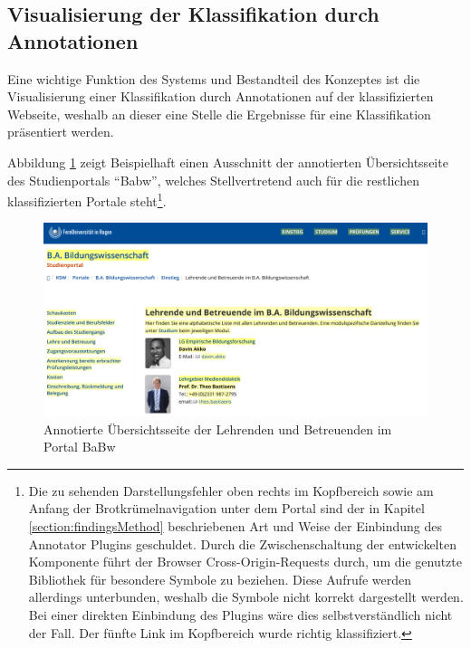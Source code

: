 \subsection{Visualisierung der Klassifikation durch Annotationen}
    Eine wichtige Funktion des Systems und Bestandteil des Konzeptes
    ist die Visualisierung einer Klassifikation durch Annotationen
    auf der klassifizierten Webseite,
    weshalb an dieser eine Stelle die Ergebnisse
    für eine Klassifikation präsentiert werden.

    Abbildung \ref{image:findingTeachersAnnotationsOverview}
    zeigt Beispielhaft einen Ausschnitt der annotierten Übersichtsseite
    des Studienportals "`Babw"',
    welches Stellvertretend auch für die restlichen klassifizierten Portale
    steht\footnote{Die zu sehenden Darstellungsfehler oben rechts im Kopfbereich
    sowie am Anfang der Brotkrümelnavigation unter dem Portal
    sind der in Kapitel \ref{section:findingsMethod} beschriebenen
    Art und Weise der Einbindung des Annotator Plugins geschuldet.
    Durch die Zwischenschaltung der entwickelten Komponente
    führt der Browser Cross-Origin-Requests durch,
    um die genutzte Bibliothek für besondere Symbole zu beziehen.
    Diese Aufrufe werden allerdings unterbunden,
    weshalb die Symbole nicht korrekt dargestellt werden.
    Bei einer direkten Einbindung des Plugins wäre dies selbstverständlich nicht der Fall.
    Der fünfte Link im Kopfbereich wurde richtig klassifiziert.}.

    \begin{figure}[htb]
        \centering
        \includegraphics[width=\textwidth]{../resources/findings/case-study-1/babw/annotations/overview.png}
        \caption{Annotierte Übersichtsseite der Lehrenden und Betreuenden im Portal BaBw}
        \label{image:findingTeachersAnnotationsOverview}
    \end{figure}

